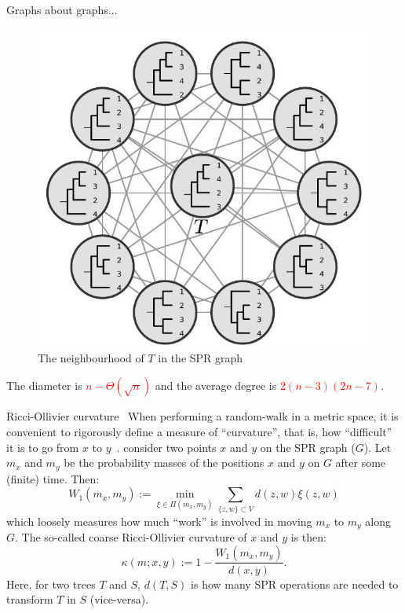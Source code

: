 \begin{frame}{Graphs about graphs...}
 \begin{center}
  \begin{figure}
   \includegraphics[scale=0.35]{FIGURES/spr_graph.jpg}
   \caption{The neighbourhood of $T$ in the SPR graph~\citep{whidden2015}}
  \end{figure}
   The diameter is \textcolor{red}{$n - \Theta(\sqrt{n})$} and the average degree is \textcolor{red}{$2(n-3)(2n-7)$}.
 \end{center}
\end{frame}
\begin{frame}{Ricci-Ollivier curvature~\citep{whidden2015}}
 When performing a random-walk in a metric space, it is convenient to rigorously define a measure of ``curvature'', that is, how ``difficult'' it is to go from $x$ to $y$~\citep{ollivier2009}.
 \cite{whidden2015} consider two points $x$ and $y$ on the SPR graph ($G$).
 Let $m_x$ and $m_y$ be the probability masses of the positions $x$ and $y$ on $G$ after some (finite) time. Then:
 \begin{equation}
 W_1(m_x, m_y) := \min_{\xi \in \Pi(m_x, m_y)} \sum_{\{z,w\} \subset V} d(z,w) \xi(z,w)
 \end{equation}
which loosely measures how much ``work'' is involved in moving $m_x$ to $m_y$ along $G$.
The so-called coarse Ricci-Ollivier curvature of $x$ and $y$ is then:
\begin{equation}
\kappa(m; x, y) := 1 - \frac{W_1(m_x, m_y)}{d(x, y)}.
\end{equation}
Here, for two trees $T$ and $S$, $d(T,S)$ is how many SPR operations are needed to transform $T$ in $S$ (vice-versa). 
\end{frame}
